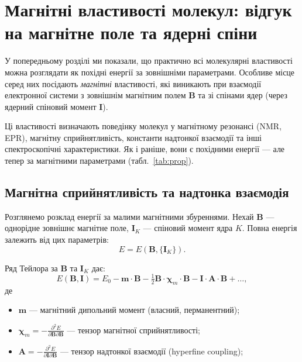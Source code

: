 \chapter{Магнітні властивості молекул: відгук на магнітне поле та ядерні спіни}

У попередньому розділі ми показали, що практично всі молекулярні властивості можна розглядати як похідні енергії за зовнішніми параметрами. Особливе місце серед них посідають \emph{магнітні} властивості, які виникають при взаємодії електронної системи з зовнішнім магнітним полем \(\mathbf B\) та зі спінами ядер (через ядерний спіновий момент \(\mathbf I\)).

Ці властивості визначають поведінку молекул у магнітному резонансі (NMR, EPR), магнітну сприйнятливість, константи надтонкої взаємодії та інші спектроскопічні характеристики. Як і раніше, вони є похідними енергії — але тепер за магнітними параметрами (табл.~\ref{tab:prop}).

\section{Магнітна сприйнятливість та надтонка взаємодія}

Розглянемо розклад енергії за малими магнітними збуреннями. Нехай \(\mathbf B\) — однорідне зовнішнє магнітне поле, \(\mathbf I_K\) — спіновий момент ядра \(K\). Повна енергія залежить від цих параметрів:
\begin{equation}
	E = E(\mathbf B, \{\mathbf I_K\}).
\end{equation}

Ряд Тейлора за \(\mathbf B\) та \(\mathbf I_K\) дає:
\begin{equation}
	E(\mathbf B, \mathbf I)
	= E_0
	- \mathbf m \cdot \mathbf B
	- \tfrac12 \mathbf B \cdot \boldsymbol\chi_m \cdot \mathbf B
	- \mathbf I \cdot \mathbf A \cdot \mathbf B
	+ \dots ,
	\label{eq:E_magnetic_Taylor}
\end{equation}
де
\begin{itemize}
	\item \(\mathbf m\) — магнітний дипольний момент (власний, перманентний);
	\item \(\boldsymbol\chi_m = -\frac{\partial^2 E}{\partial \mathbf B \partial \mathbf B}\) — тензор магнітної сприйнятливості;
	\item \(\mathbf A = -\frac{\partial^2 E}{\partial \mathbf I \partial \mathbf B}\) — тензор надтонкої взаємодії (hyperfine coupling);
\end{itemize}

